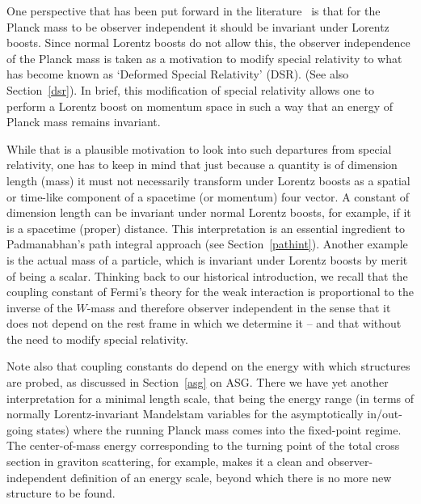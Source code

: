 \documentclass{article}
\begin{document}
One perspective that has been put forward in the literature~\cite{AmelinoCamelia:2000ge,KowalskiGlikman:2001gp,AmelinoCamelia:2002wr,Magueijo:2002am} is that for the 
 Planck mass to be observer independent it should be invariant under Lorentz boosts.
Since normal Lorentz boosts do not allow this, the observer independence of the
Planck mass is taken as a motivation to modify special relativity to what has become
known as `Deformed Special Relativity' (DSR). (See also Section~\ref{dsr}).
In brief, this modification of special relativity allows one to perform a Lorentz boost
on momentum space in such a way that an energy of Planck mass remains invariant. 
 
While that is a plausible motivation to look into such departures from special
relativity, one has to keep in mind that just because a quantity is of dimension length (mass)
it must not necessarily transform under Lorentz boosts as a spatial or time-like
component of a spacetime (or momentum) four vector.  A  constant of dimension length can be invariant 
under normal Lorentz boosts, for example, if it is a spacetime (proper) distance. This interpretation 
is an essential ingredient to Padmanabhan's path integral approach (see Section~\ref{pathint}).
Another example is the actual
mass of a particle, which is invariant under Lorentz boosts by merit of being 
a scalar. Thinking back to our historical introduction, we recall that the 
coupling constant of Fermi's theory for the weak interaction is proportional 
to the inverse of the $W$-mass and therefore observer independent in the sense
that it does not depend on the rest frame in which we determine it -- and that without the
need to modify special relativity. 

Note also that coupling constants do depend 
on the energy with which structures are probed, as discussed in Section~\ref{asg}
on ASG. 
There we have yet another interpretation for a
minimal length scale, that being the energy range (in terms of normally Lorentz-invariant
Mandelstam variables for the asymptotically in/out-going states) where the running Planck
mass comes into the
fixed-point regime. The center-of-mass energy corresponding to the turning point of
the total cross section in graviton scattering, for example, makes it a clean and
observer-independent definition of an energy scale, beyond which there is no
more new structure to be found. 
\end{document}
